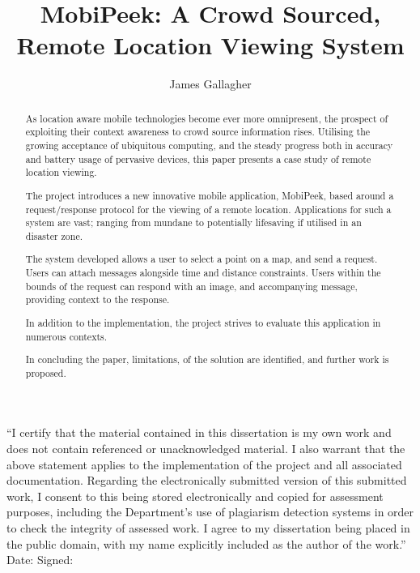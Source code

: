 \documentclass[a4paper]{article}
\begin{document}
\author{James Gallagher}
\title{\vspace{50mm} MobiPeek: A Crowd Sourced,\protect\\ Remote Location Viewing System}





\maketitle
\newpage
\begin{abstract}

As location aware mobile technologies become ever more omnipresent, the prospect of exploiting their context awareness to crowd source information rises. Utilising the growing acceptance of ubiquitous computing, and the steady progress both in accuracy and battery usage of pervasive devices, this paper  presents a case study of remote location viewing.

The project introduces a new innovative mobile application, MobiPeek, based around a request/response protocol for the viewing of a remote location. Applications for such a system are vast; ranging from mundane to potentially lifesaving if utilised in an disaster zone.

The system developed allows a user to select a point on a map, and send a request. Users can attach messages alongside time and distance constraints. Users within the bounds of the request can respond with an image, and accompanying message, providing context to the response.

In addition to the implementation, the project strives to evaluate this application in numerous contexts.

In concluding the paper, limitations, of the solution are identified, and further work is proposed.
\end{abstract}
\newpage

“I certify that the material contained in this dissertation is my own work and
does not contain referenced or unacknowledged material. I also warrant that
the above statement applies to the implementation of the project and all
associated documentation. Regarding the electronically submitted version of
this submitted work, I consent to this being stored electronically and copied for
assessment purposes, including the Department’s use of plagiarism detection
systems in order to check the integrity of assessed work.
I agree to my dissertation being placed in the public domain, with my name
explicitly included as the author of the work.”
\newline 
Date:
\newline
Signed:
\newpage
\end{document}
